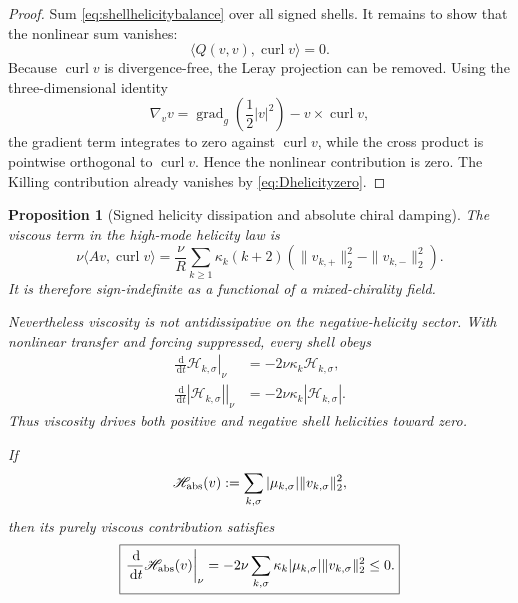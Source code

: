 \documentclass[
 aps,
 prd,
 reprint,
 amsmath,
 amssymb,
 nofootinbib,
 superscriptaddress
]{revtex4-2}
\newtheorem{proposition}[theorem]{Proposition}
\theoremstyle{definition}
\theoremstyle{remark}
\newcommand{\curl}{\operatorname{curl}}
\newcommand{\gradg}{\operatorname{grad}_g}
\newcommand{\dd}{\,\mathrm d}
\begin{document}
\begin{proof}
Sum \eqref{eq:shellhelicitybalance} over all signed shells.  It remains to
show that the nonlinear sum vanishes:
\[
 \langle Q(v,v),\curl v\rangle=0.
\]
Because $\curl v$ is divergence-free, the Leray projection can be removed.
Using the three-dimensional identity
\[
 \nabla_vv
 =
 \gradg\!\left(\frac12|v|^2\right)
 -
 v\times\curl v,
\]
the gradient term integrates to zero against $\curl v$, while the cross
product is pointwise orthogonal to $\curl v$.  Hence the nonlinear
contribution is zero.  The Killing contribution already vanishes by
\eqref{eq:Dhelicityzero}.
\end{proof}

\begin{proposition}[Signed helicity dissipation and absolute chiral damping]
\label{prop:helicitydissipation}
The viscous term in the high-mode helicity law is
\begin{equation}
 \boxed{
 \nu\langle Av,\curl v\rangle
 =
 \frac{\nu}{R}
 \sum_{k\ge1}\kappa_k(k+2)
 \left(
   \|v_{k,+}\|_2^2-\|v_{k,-}\|_2^2
 \right).
 }
 \label{eq:signedhelicitydiss}
\end{equation}
It is therefore sign-indefinite as a functional of a mixed-chirality field.

Nevertheless viscosity is not antidissipative on the negative-helicity
sector.  With nonlinear transfer and forcing suppressed, every shell obeys
\begin{equation}
\begin{aligned}
 \left.\frac{\dd}{\dd t}\mathscr H_{k,\sigma}\right|_{\nu}
 &=
 -2\nu\kappa_k\mathscr H_{k,\sigma},\\
 \left.\frac{\dd}{\dd t}|\mathscr H_{k,\sigma}|\right|_{\nu}
 &=
 -2\nu\kappa_k|\mathscr H_{k,\sigma}|.
\end{aligned}
\label{eq:absolutechiraldecay}
\end{equation}
Thus viscosity drives both positive and negative shell helicities toward
zero.

If
\begin{equation}
 \mathscr H_{\rm abs}(v)
 :=
 \sum_{k,\sigma}
 |\mu_{k,\sigma}|\|v_{k,\sigma}\|_2^2,
 \label{eq:absolutehelicity}
\end{equation}
then its purely viscous contribution satisfies
\begin{equation}
 \boxed{
 \left.\frac{\dd}{\dd t}\mathscr H_{\rm abs}(v)\right|_{\nu}
 =
 -2\nu
 \sum_{k,\sigma}
 \kappa_k|\mu_{k,\sigma}|\|v_{k,\sigma}\|_2^2
 \le0.
 }
 \label{eq:absolutehelicitydecay}
\end{equation}
\end{proposition}
\end{document}
